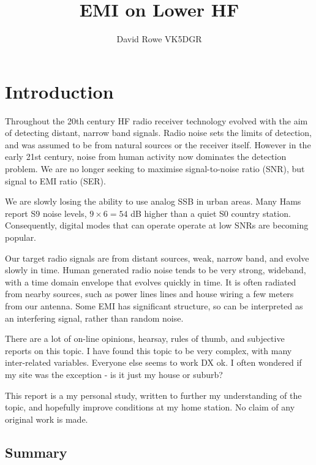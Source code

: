 \documentclass{article}
\begin{document}
\title{EMI on Lower HF}
\author{David Rowe VK5DGR}

\maketitle

\section{Introduction}
 
Throughout the 20th century HF radio receiver technology evolved with the aim of detecting distant, narrow band signals.  Radio noise sets the limits of detection, and was assumed to be from natural sources or the receiver itself.  However in the early 21st century, noise from human activity now dominates the detection problem.  We are no longer seeking to maximise signal-to-noise ratio (SNR), but signal to EMI ratio (SER).

We are slowly losing the ability to use analog SSB in urban areas.  Many Hams report S9 noise levels, $9 \times 6 = 54$ dB higher than a quiet S0 country station.  Consequently, digital modes that can operate operate at low SNRs are becoming popular.

Our target radio signals are from distant sources, weak, narrow band, and evolve slowly in time. Human generated radio noise tends to be very strong, wideband, with a time domain envelope that evolves quickly in time.  It is often radiated from nearby sources, such as power lines lines and house wiring a few meters from our antenna.  Some EMI has significant structure, so can be interpreted as an interfering signal, rather than random noise.

There are a lot of on-line opinions, hearsay, rules of thumb, and subjective reports on this topic.  I have found this topic to be very complex, with many inter-related variables. Everyone else seems to work DX ok. I often wondered if my site was the exception - is it just my house or suburb?  

This report is a my personal study, written to further my understanding of the topic, and hopefully improve conditions at my home station. No claim of any original work is made.

\subsection{Summary}
\end{document}
